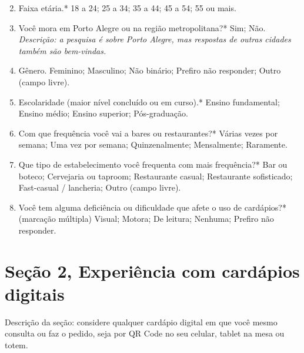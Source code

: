 \begin{enumerate}\setcounter{enumi}{1}
	\item Faixa etária.* 18 a 24; 25 a 34; 35 a 44; 45 a 54; 55 ou mais.
	\item Você mora em Porto Alegre ou na região metropolitana?* Sim; Não. \emph{Descrição: a pesquisa é sobre Porto Alegre, mas respostas de outras cidades também são bem-vindas.}
	\item Gênero. Feminino; Masculino; Não binário; Prefiro não responder; Outro (campo livre).
	\item Escolaridade (maior nível concluído ou em curso).* Ensino fundamental; Ensino médio; Ensino superior; Pós-graduação.
	\item Com que frequência você vai a bares ou restaurantes?* Várias vezes por semana; Uma vez por semana; Quinzenalmente; Mensalmente; Raramente.
	\item Que tipo de estabelecimento você frequenta com mais frequência?* Bar ou boteco; Cervejaria ou taproom; Restaurante casual; Restaurante sofisticado; Fast-casual / lancheria; Outro (campo livre).
	\item Você tem alguma deficiência ou dificuldade que afete o uso de cardápios?* (marcação múltipla) Visual; Motora; De leitura; Nenhuma; Prefiro não responder.
\end{enumerate}

\section*{Seção 2, Experiência com cardápios digitais}

Descrição da seção: considere qualquer cardápio digital em que você mesmo consulta ou faz o pedido, seja por QR Code no seu celular, tablet na mesa ou totem.

